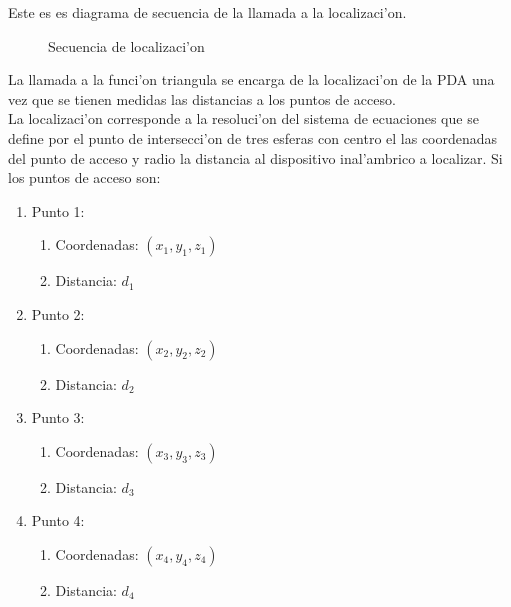 Este es es diagrama de secuencia de la llamada a la localizaci'on.
\begin{figure}[h!]
	\begin{center}
     	\end{center}
    	\caption{Secuencia de localizaci'on}\label{fig:triang5}
\end{figure}

La llamada a la funci'on triangula se encarga de la localizaci'on de la PDA una vez que se tienen medidas las distancias a los puntos de acceso.\bigskip \\ La localizaci'on corresponde a la resoluci'on del sistema de ecuaciones que se define por el punto de intersecci'on de tres esferas con centro el las coordenadas del punto de acceso y radio la distancia al dispositivo inal'ambrico a localizar. Si los puntos de acceso son:

\begin{enumerate}
\item Punto 1: 
	\begin{enumerate}
	\item Coordenadas: $(x_1,y_1,z_1)$
	\item Distancia: $d_1$
	\end{enumerate}

\item Punto 2: 
	\begin{enumerate}
	\item Coordenadas: $(x_2,y_2,z_2)$
	\item Distancia: $d_2$
	\end{enumerate}

\item Punto 3: 
	\begin{enumerate}
	\item Coordenadas: $(x_3,y_3,z_3)$
	\item Distancia: $d_3$
	\end{enumerate}

\item Punto 4: 
	\begin{enumerate}
	\item Coordenadas: $(x_4,y_4,z_4)$
	\item Distancia: $d_4$
	\end{enumerate}
\end{enumerate}

